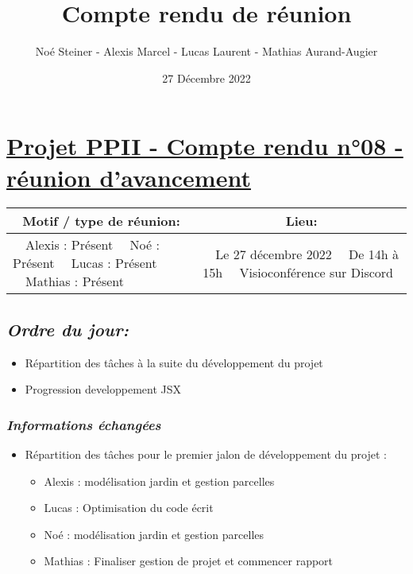 \documentclass[french,a4paper]{article}
\author{Noé Steiner - Alexis Marcel - Lucas Laurent - Mathias Aurand-Augier}
\date{27 Décembre 2022}
\newcommand{\tabitem}{\textbullet~~}\title{Compte rendu de réunion}
\begin{document}
\maketitle

\section*{\underline{Projet PPII - Compte rendu n°08 - réunion d'avancement}}

\begin{table}[!htb]
  \centering
  \begin{tabular}{| p{7cm} | p{7cm} |}
    \hline
    \multicolumn{1}{|c|}{ Motif / type de réunion:} & \multicolumn{1}{c|}{Lieu:} \\
    \hline
    \tabitem Alexis : Présent\newline
    \tabitem Noé : Présent\newline
    \tabitem Lucas : Présent\newline
    \tabitem Mathias : Présent                      &
    \tabitem Le 27 décembre 2022\newline
    \tabitem De 14h à 15h\newline
    \tabitem Visioconférence sur Discord                                         \\
    \hline
  \end{tabular}
\end{table}

\subsection*{\textit{Ordre du jour:}}

\begin{itemize}
  \item Répartition des tâches à la suite du développement du projet
  \item Progression developpement JSX
\end{itemize}

\subsubsection*{\textit{Informations échangées}}
\begin{itemize}
  \item Répartition des tâches pour le premier jalon de développement du projet :
    \begin{itemize}
      \item Alexis : modélisation jardin et gestion parcelles
      \item Lucas : Optimisation du code écrit
      \item Noé : modélisation jardin et gestion parcelles
      \item Mathias : Finaliser gestion de projet et commencer rapport
    \end{itemize}
\end{itemize}
\end{document}
